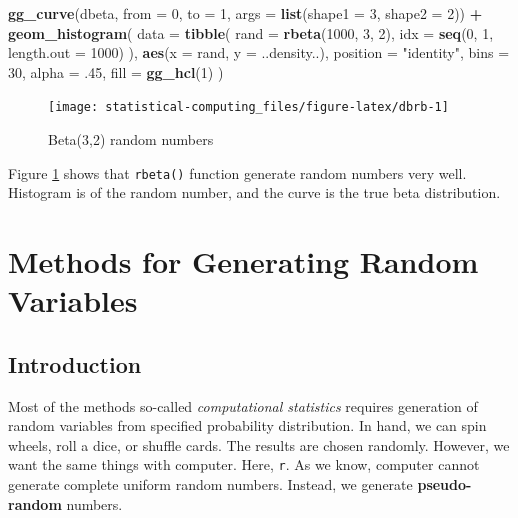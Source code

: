 \documentclass[]{book}
\newenvironment{Shaded}{\begin{snugshade}}{\end{snugshade}}
\newcommand{\DataTypeTok}[1]{\textcolor[rgb]{0.13,0.29,0.53}{#1}}
\newcommand{\DecValTok}[1]{\textcolor[rgb]{0.00,0.00,0.81}{#1}}
\newcommand{\FloatTok}[1]{\textcolor[rgb]{0.00,0.00,0.81}{#1}}
\newcommand{\KeywordTok}[1]{\textcolor[rgb]{0.13,0.29,0.53}{\textbf{#1}}}
\newcommand{\NormalTok}[1]{#1}
\newcommand{\OperatorTok}[1]{\textcolor[rgb]{0.81,0.36,0.00}{\textbf{#1}}}
\newcommand{\StringTok}[1]{\textcolor[rgb]{0.31,0.60,0.02}{#1}}
\theoremstyle{definition}
\theoremstyle{definition}
\theoremstyle{definition}
\theoremstyle{remark}
\begin{document}
\begin{Shaded}
\begin{Highlighting}[]
\KeywordTok{gg_curve}\NormalTok{(dbeta, }\DataTypeTok{from =} \DecValTok{0}\NormalTok{, }\DataTypeTok{to =} \DecValTok{1}\NormalTok{, }\DataTypeTok{args =} \KeywordTok{list}\NormalTok{(}\DataTypeTok{shape1 =} \DecValTok{3}\NormalTok{, }\DataTypeTok{shape2 =} \DecValTok{2}\NormalTok{)) }\OperatorTok{+}
\StringTok{  }\KeywordTok{geom_histogram}\NormalTok{(}
    \DataTypeTok{data =} \KeywordTok{tibble}\NormalTok{(}
      \DataTypeTok{rand =} \KeywordTok{rbeta}\NormalTok{(}\DecValTok{1000}\NormalTok{, }\DecValTok{3}\NormalTok{, }\DecValTok{2}\NormalTok{),}
      \DataTypeTok{idx =} \KeywordTok{seq}\NormalTok{(}\DecValTok{0}\NormalTok{, }\DecValTok{1}\NormalTok{, }\DataTypeTok{length.out =} \DecValTok{1000}\NormalTok{)}
\NormalTok{    ),}
    \KeywordTok{aes}\NormalTok{(}\DataTypeTok{x =}\NormalTok{ rand, }\DataTypeTok{y =}\NormalTok{ ..density..),}
    \DataTypeTok{position =} \StringTok{"identity"}\NormalTok{,}
    \DataTypeTok{bins =} \DecValTok{30}\NormalTok{,}
    \DataTypeTok{alpha =} \FloatTok{.45}\NormalTok{,}
    \DataTypeTok{fill =} \KeywordTok{gg_hcl}\NormalTok{(}\DecValTok{1}\NormalTok{)}
\NormalTok{  )}
\end{Highlighting}
\end{Shaded}

\begin{figure}[H]

{\centering \texttt{[image: statistical-computing\_files/figure-latex/dbrb-1]} 

}

\caption{Beta(3,2) random numbers}\label{fig:dbrb}
\end{figure}

Figure \ref{fig:dbrb} shows that \texttt{rbeta()} function generate random numbers very well. Histogram is of the random number, and the curve is the true beta distribution.

\hypertarget{rvar}{%
\chapter{Methods for Generating Random Variables}\label{rvar}}

\hypertarget{introduction}{%
\section{Introduction}\label{introduction}}

Most of the methods so-called \emph{computational statistics} requires generation of random variables from specified probability distribution. In hand, we can spin wheels, roll a dice, or shuffle cards. The results are chosen randomly. However, we want the same things with computer. Here, \texttt{r}. As we know, computer cannot generate complete uniform random numbers. Instead, we generate \textbf{pseudo-random} numbers.
\end{document}
